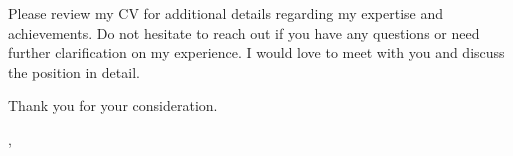 \documentclass[12pt]{letter}
\begin{document}
Please review my CV for additional details regarding my expertise and
achievements. Do not hesitate to reach out if you have any questions or need further
clarification on my experience. I would love to meet with you and discuss the position in
detail.

\noindent Thank you for your consideration.


\vspace{0.1in}
\vfill

\begin{flushright}
\closer,

\myname\\
\mytitle
\end{flushright}
\end{document}
